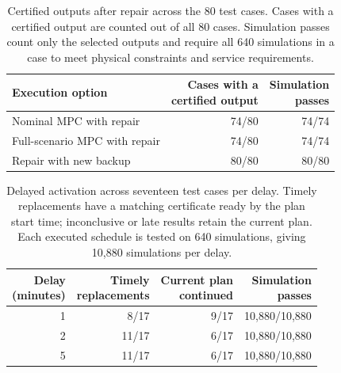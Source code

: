 \documentclass[final]{cas-sc}
\theoremstyle{definition}
\theoremstyle{plain}
\theoremstyle{definition}
\theoremstyle{plain}
\begin{document}
\begin{table}[pos=!htb]
\centering\small
\caption{Certified outputs after repair across the 80 test cases. Cases
with a certified output are counted out of all 80 cases. Simulation
passes count only the selected outputs and require all 640 simulations
in a case to meet physical constraints and service requirements.}
\label{tab:repair-outcomes}
\begin{tabularx}{\linewidth}{@{}Xrr@{}}
\toprule
Execution option & \shortstack{Cases with a\\certified output} &
\shortstack{Simulation\\passes}\\
\midrule
Nominal MPC with repair & 74/80 & 74/74\\
Full-scenario MPC with repair & 74/80 & 74/74\\
Repair with new backup & 80/80 & 80/80\\
\bottomrule
\end{tabularx}
\end{table}

\begin{table}[pos=!htb]
\centering\small
\caption{Delayed activation across seventeen test cases per delay. Timely
replacements have a matching certificate ready by the plan start time; inconclusive
or late results retain the current plan. Each executed schedule is tested
on 640 simulations, giving 10,880 simulations per delay.}
\label{tab:activation-delay-results}
\begin{tabular}{@{}rrrr@{}}
\toprule
\shortstack{Delay\\(minutes)} & \shortstack{Timely\\replacements} &
\shortstack{Current plan\\continued} & \shortstack{Simulation\\passes}\\
\midrule
1 & 8/17 & 9/17 & 10,880/10,880\\
2 & 11/17 & 6/17 & 10,880/10,880\\
5 & 11/17 & 6/17 & 10,880/10,880\\
\bottomrule
\end{tabular}
\end{table}
\end{document}
